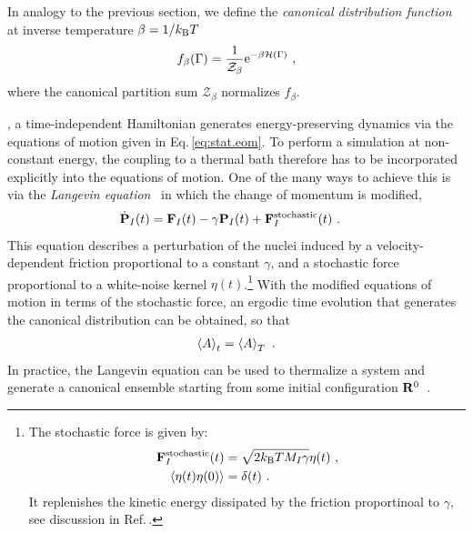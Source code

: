 In analogy to the previous section, we define the \emph{canonical distribution function} at inverse temperature $\beta = 1 / k_{\rm B} T$
\begin{align}
	f_\beta (\Gamma) 
		= \frac{1}{\mathcal{Z}_\beta} {\rm e}^{- \beta \mathcal H (\Gamma)}~,
	\label{eq:f.canonical}
\end{align}
where the  canonical partition sum $\mathcal{Z}_\beta$ normalizes $f_\beta$. 

, a time-independent Hamiltonian generates energy-preserving dynamics via the equations of motion given in Eq.\,\eqref{eq:stat.eom}. To perform a simulation at non-constant energy, the coupling to a thermal bath therefore has to be incorporated explicitly into the equations of motion. One of the many ways to achieve this is via the \emph{Langevin equation}~\cite{Vanden2006} in which the change of momentum is modified,
\begin{align}
	\dot{\b P}_I (t) 
		&= \b F_I (t) - \gamma \b P_I (t) + \b F^{\rm stochastic}_I (t)~.
	\label{eq:stat.Langevin}
\end{align}
This equation describes a perturbation of the nuclei induced by a velocity-dependent friction proportional to a constant $\gamma$, %
and a stochastic force proportional to a white-noise kernel $\eta (t)$.\footnote{
	The stochastic force is given by:
	\begin{align*}
	{\bf F}^{\rm stochastic}_I (t) 
	&= \sqrt{2 k_{\rm B} T M_I \gamma} \eta (t)~, \\
	\braket{\eta (t) \eta (0)}
	& = \delta (t)~.
	\end{align*}
	It replenishes the kinetic energy dissipated by the friction proportinoal to $\gamma$, see discussion in Ref.\,\cite[p.\,328]{Phillies2012}.
}
With the modified equations of motion in terms of the stochastic force, an ergodic time evolution that generates the canonical distribution can be obtained, so that
\begin{align}
  \braket{A}_t = \braket{A}_{T}~.
\end{align}
In practice, the Langevin equation can be used to thermalize a system and generate a canonical ensemble starting from some initial configuration ${\bf R}^0$~\cite[p.\,590]{Tuckerman}.

